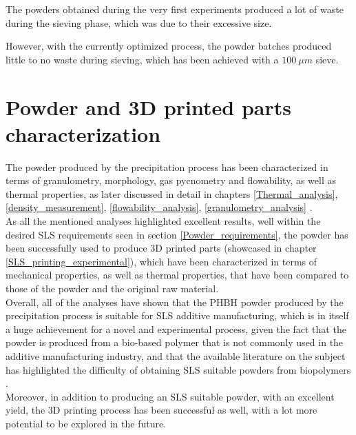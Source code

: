 \documentclass{article}
\begin{document}
    The powders obtained during the very first experiments produced a lot of waste during the sieving phase, which was due to their excessive size. 

    However, with the currently optimized process, the powder batches produced little to no waste during sieving, which has been achieved 
    with a $100 \ \mu m$ sieve. \\

    \clearpage

    \section{Powder and 3D printed parts characterization\label{powder_characterization}}

    The powder produced by the precipitation process has been characterized in terms of granulometry, morphology, gas pycnometry and flowability, 
    as well as thermal properties, as later discussed in detail in chapters \ref{Thermal_analysis}, \ref{density_measurement}, 
    \ref{flowability_analysis}, \ref{granulometry_analysis} . \\

    As all the mentioned analyses highlighted excellent results, well within the desired SLS requirements seen in section \ref{Powder_requirements}, the powder has been successfully used to produce 3D printed parts
    (showcased in chapter \ref{SLS_printing_experimental}), which have been characterized in terms of mechanical properties, as well as thermal properties, that have been 
    compared to those of the powder and the original raw material. \\

    Overall, all of the analyses have shown that the PHBH powder produced by the precipitation process is suitable for SLS additive manufacturing, which is in itself a huge achievement for a 
    novel and experimental process, given the fact that the powder is produced from a bio-based polymer that is not commonly used in the additive manufacturing industry, and that 
    the available literature on the subject has highlighted the difficulty of obtaining SLS suitable powders from biopolymers \autocites{Padovano_SLS_Review}. \\ 

    Moreover, in addition to producing an SLS suitable powder, with an excellent yield, the 3D printing process has been successful as well, with 
    a lot more potential to be explored in the future. \\ 
\end{document}
